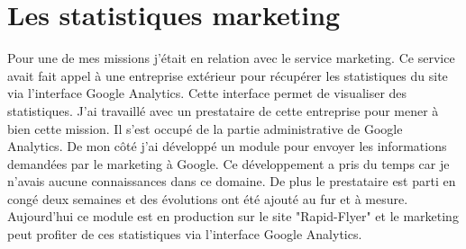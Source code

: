 \section{Les statistiques marketing}
Pour une de mes missions j'était en relation avec le service marketing. Ce service avait fait appel à une entreprise extérieur pour récupérer les statistiques du site via l'interface Google Analytics. Cette interface permet de visualiser des statistiques.\newline
J'ai travaillé avec un prestataire de cette entreprise pour mener à bien cette mission. Il s'est occupé de la partie administrative de Google Analytics. De mon côté j'ai développé un module pour envoyer les informations demandées par le marketing à Google. Ce développement a pris du temps car je n'avais aucune connaissances dans ce domaine. De plus le prestataire est parti en congé deux semaines et des évolutions ont été ajouté au fur et à mesure. Aujourd'hui ce module est en production sur le site "Rapid-Flyer" et le marketing peut profiter de ces statistiques via l'interface Google Analytics.